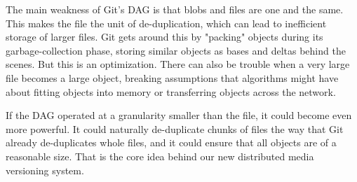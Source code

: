 The main weakness of Git's DAG is that blobs and files are one and the same.
This makes the file the unit of de-duplication, which can lead to inefficient
storage of larger files. Git gets around this by "packing" objects during its
garbage-collection phase, storing similar objects as bases and deltas behind the
scenes. But this is an optimization. There can also be trouble when a very large
file becomes a large object, breaking assumptions that algorithms might have
about fitting objects into memory or transferring objects across the network.

If the DAG operated at a granularity smaller than the file, it could become even
more powerful. It could naturally de-duplicate chunks of files the way that Git
already de-duplicates whole files, and it could ensure that all objects are of a
reasonable size. That is the core idea behind our new distributed media
versioning system.
